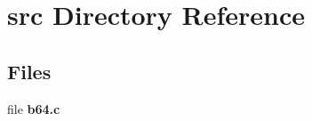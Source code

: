 \section{src Directory Reference}
\label{dir_0578ac8ed6d9c718bb4229df0888daf5}
\subsection*{Files}
\begin{DoxyCompactItemize}
\item 
file \textbf{ b64.\+c}
\end{DoxyCompactItemize}
